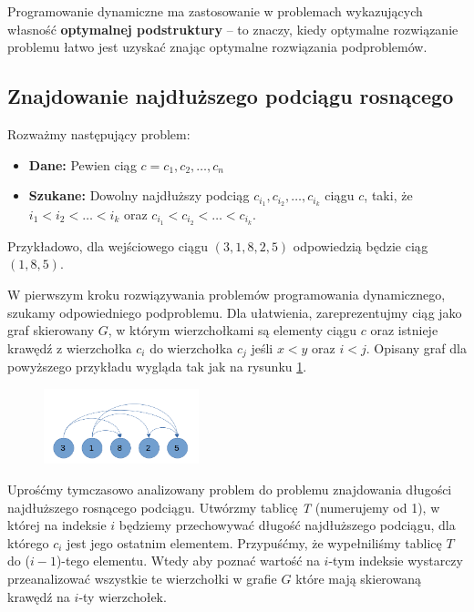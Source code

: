 Programowanie dynamiczne ma zastosowanie w problemach wykazujących 
własność \textbf{optymalnej podstruktury} –
to znaczy, kiedy optymalne rozwiązanie problemu 
łatwo jest uzyskać znając optymalne rozwiązania podproblemów. 

\subsection{Znajdowanie najdłuższego podciągu rosnącego}
Rozważmy następujący problem: 
\begin{itemize}
	\item[] \textbf{Dane:} Pewien ciąg $c = c_1,c_2, \ldots, c_n$
	\item[] \textbf{Szukane:} Dowolny najdłuższy podciąg 
	$c_{i_1},c_{i_2},\ldots, c_{i_k}$ ciągu $c$, taki, że
	$i_1 < i_2 < \ldots < i_k$ oraz $c_{i_1} < c_{i_2} < \ldots < c_{i_k}$.    
\end{itemize}

Przykładowo, dla wejściowego ciągu $(3, 1, 8, 2, 5)$ odpowiedzią będzie
ciąg $(1, 8, 5)$.

W pierwszym kroku rozwiązywania problemów programowania dynamicznego, szukamy
odpowiedniego podproblemu. Dla ułatwienia, zareprezentujmy ciąg jako 
graf skierowany $G$, w którym wierzchołkami są elementy ciągu $c$ oraz 
istnieje krawędź z wierzchołka $c_i$ do wierzchołka $c_j$ jeśli $x < y$
oraz $i < j$. 
Opisany graf dla powyższego przykładu wygląda tak jak na rysunku
\ref{fig:example111_max_length}.

\begin{figure}[H]
	\centering
	\includegraphics[width=0.4\textwidth]{data/prblm1_ex_graph.png}
	\caption{ }
	\label{fig:example111_max_length}
\end{figure}

Uprośćmy tymczasowo analizowany problem do problemu znajdowania 
długości najdłuższego rosnącego podciągu. Utwórzmy tablicę \textit{T} 
(numerujemy od 1), w której na indeksie $i$ 
będziemy przechowywać długość najdłuższego podciągu, dla którego $c_i$
jest jego ostatnim elementem. Przypuśćmy, że wypełniliśmy tablicę 
$T$ do ($i-1$)-tego elementu.
Wtedy aby poznać wartość na $i$-tym indeksie wystarczy przeanalizować 
wszystkie te wierzchołki w grafie $G$ które mają skierowaną krawędź na
$i$-ty wierzchołek.

